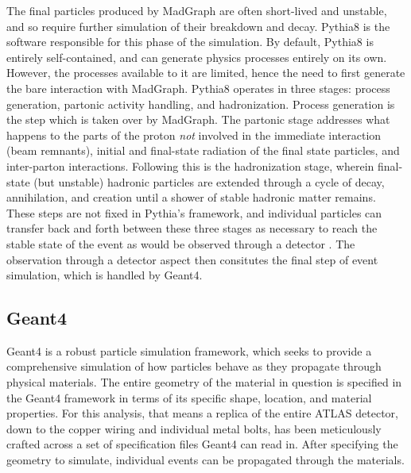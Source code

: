    The final particles produced by MadGraph are often short-lived and unstable,
        and so require further simulation of their breakdown and decay.
    Pythia8 is the software responsible for this phase of the simulation. 
    By default, Pythia8 is entirely self-contained, and can generate physics processes entirely on its own.
    However, the processes available to it are limited,
        hence the need to first generate the bare interaction with MadGraph.
    Pythia8 operates in three stages: process generation, partonic activity handling, and hadronization.
    Process generation is the step which is taken over by MadGraph.
    The partonic stage addresses what happens to the parts of the proton \textit{not} involved in the immediate interaction (beam remnants),
        initial and final-state radiation of the final state particles, and inter-parton interactions.
    Following this is the hadronization stage, wherein final-state (but unstable)
        hadronic particles are extended through a cycle of decay, annihilation, and creation
        until a shower of stable hadronic matter remains.
    These steps are not fixed in Pythia's framework,
        and individual particles can transfer back and forth between these three stages
        as necessary to reach the stable state of the event as would be observed through a detector
        \cite{pythia}.
    The observation through a detector aspect then consitutes the final step of event simulation,
        which is handled by Geant4.

    \subsection{Geant4}

    Geant4 is a robust particle simulation framework,
        which seeks to provide a comprehensive simulation of how particles behave as they propagate through physical materials.
    The entire geometry of the material in question is specified in the Geant4 framework in terms of
        its specific shape, location, and material properties.
    For this analysis, that means a replica of the entire ATLAS detector,
        down to the copper wiring and individual metal bolts,
        has been meticulously crafted across a set of specification files Geant4 can read in.
    After specifying the geometry to simulate, individual events can be propagated through the materials.

